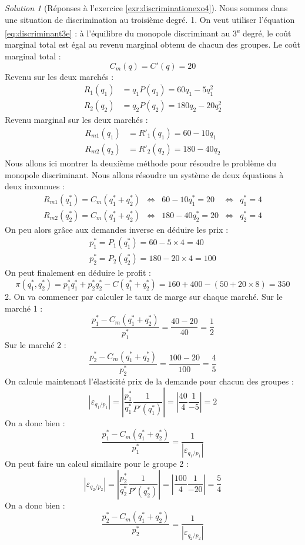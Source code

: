 \documentclass[
]{book}
\theoremstyle{definition}
\theoremstyle{definition}
\theoremstyle{definition}
\theoremstyle{definition}
\theoremstyle{remark}
\newtheorem*{solution}{Solution}
\begin{document}
\begin{solution}[Réponses à l'exercice \ref{exr:discriminationexo4}]
Nous sommes dans une situation de discrimination au troisième degré.
1. On veut utiliser l'équation \eqref{eq:discriminant3e} : à l'équilibre du monopole discriminant au 3\textsuperscript{e} degré, le coût marginal total est égal au revenu marginal obtenu de chacun des groupes.
Le coût marginal total :
\[C_m(q)=C'(q)=20\]
Revenu sur les deux marchés :
\[
\begin{array}{rl}
R_1(q_1)&=q_1P(q_1)=60q_1-5q_1^2\\
R_2(q_2)&=q_2P(q_2)=180q_2-20q_2^2
\end{array}
\]
Revenu marginal sur les deux marchés :
\[
\begin{array}{rl}
R_{m1}(q_1)&=R'_1(q_1)=60-10q_1\\
R_{m2}(q_2)&=R'_2(q_2)=180-40q_2
\end{array}
\]
Nous allons ici montrer la deuxième méthode pour résoudre le problème du monopole discriminant.
Nous allons résoudre un système de deux équations à deux inconnues :
\begin{align*}
R_{m1}(q_1^*)=C_m(q_1^*+q_2^*) & \Leftrightarrow & 60-10q_1^*=20 & \Leftrightarrow &q_1^*=4\\
R_{m2}(q_2^*)=C_m(q_1^*+q_2^*) & \Leftrightarrow & 180-40q_2^*=20 & \Leftrightarrow &q_2^*=4
\end{align*}
On peu alors grâce aux demandes inverse en déduire les prix :
\begin{gather*}
p_1^*=P_1(q_1^*) = 60-5\times4=40\\
p_2^*=P_2(q_2^*) = 180-20\times4=100
\end{gather*}
On peut finalement en déduire le profit :
\[\pi(q_1^*, q_2^*)=p_1^*q_1^*+p_2^*q_2^*-C(q_1^*+q_2^*)=160+400-(50+20\times8)=350\]
2. On va commencer par calculer le taux de marge sur chaque marché.
Sur le marché 1 :
\[\frac{p_1^*-C_m(q_1^*+q_2^*)}{p_1^*}=\frac{40-20}{40}=\frac{1}{2}\]
Sur le marché 2 :
\[\frac{p_2^*-C_m(q_1^*+q_2^*)}{p_2^*}=\frac{100-20}{100}=\frac{4}{5}\]
On calcule maintenant l'élasticité prix de la demande pour chacun des groupes :
\[|\varepsilon_{q_1/p_1}|=\left|\frac{p_1^*}{q_1^*}\frac{1}{P'(q^*_1)}\right|=\left|\frac{40}{4}\frac{1}{-5}\right|=2\]
On a donc bien :
\[\frac{p_1^*-C_m(q_1^*+q_2^*)}{p_1^*}=\frac{1}{|\varepsilon_{q_1/p_1}|}\]
On peut faire un calcul similaire pour le groupe 2 :
\[|\varepsilon_{q_2/p_2}|=\left|\frac{p_2^*}{q_2^*}\frac{1}{P'(q^*_2)}\right|=\left|\frac{100}{4}\frac{1}{-20}\right|=\frac{5}{4}\]
On a donc bien :
\[\frac{p_2^*-C_m(q_1^*+q_2^*)}{p_2^*}=\frac{1}{|\varepsilon_{q_2/p_2}|}\]
\end{solution}
\end{document}

